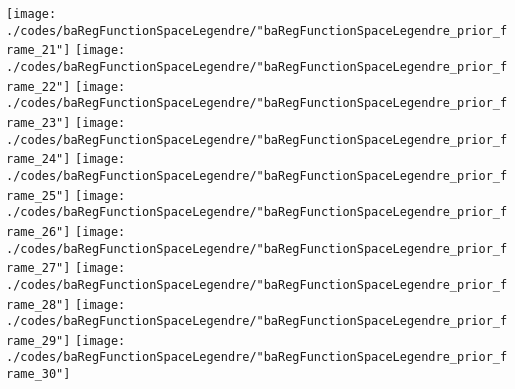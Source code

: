 \begin{frame}{\insertsection}
\begin{center}
{\begin{animateinline}{20}
				 \texttt{[image: ./codes/baRegFunctionSpaceLegendre/"baRegFunctionSpaceLegendre\_prior\_frame\_21"]}\newframe
				 \texttt{[image: ./codes/baRegFunctionSpaceLegendre/"baRegFunctionSpaceLegendre\_prior\_frame\_22"]}\newframe
				 \texttt{[image: ./codes/baRegFunctionSpaceLegendre/"baRegFunctionSpaceLegendre\_prior\_frame\_23"]}\newframe
				 \texttt{[image: ./codes/baRegFunctionSpaceLegendre/"baRegFunctionSpaceLegendre\_prior\_frame\_24"]}\newframe
				 \texttt{[image: ./codes/baRegFunctionSpaceLegendre/"baRegFunctionSpaceLegendre\_prior\_frame\_25"]}\newframe
				 \texttt{[image: ./codes/baRegFunctionSpaceLegendre/"baRegFunctionSpaceLegendre\_prior\_frame\_26"]}\newframe
				 \texttt{[image: ./codes/baRegFunctionSpaceLegendre/"baRegFunctionSpaceLegendre\_prior\_frame\_27"]}\newframe
				 \texttt{[image: ./codes/baRegFunctionSpaceLegendre/"baRegFunctionSpaceLegendre\_prior\_frame\_28"]}\newframe
				 \texttt{[image: ./codes/baRegFunctionSpaceLegendre/"baRegFunctionSpaceLegendre\_prior\_frame\_29"]}\newframe
				 \texttt{[image: ./codes/baRegFunctionSpaceLegendre/"baRegFunctionSpaceLegendre\_prior\_frame\_30"]}
			 \end{animateinline}
			}
	\end{center}
    
\end{frame}

